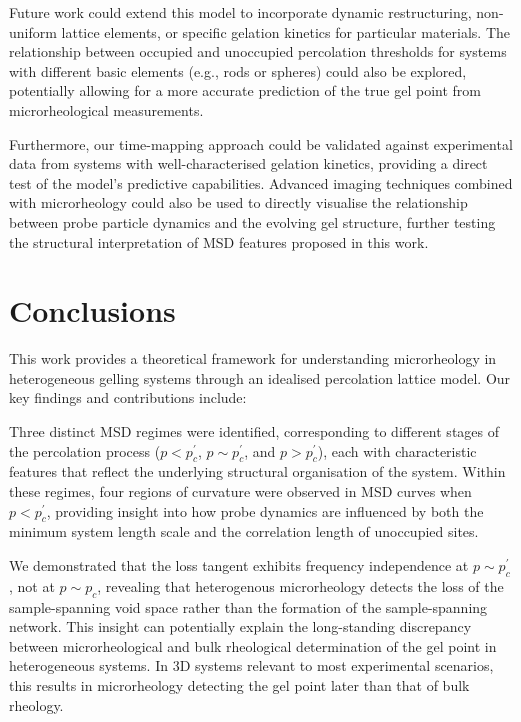 \documentclass[%
 aip,
 amsmath,amssymb,
reprint, onecolumn %
]{revtex4-1}
\begin{document}
Future work could extend this model to incorporate dynamic restructuring, non-uniform lattice elements, or specific gelation kinetics for particular materials. The relationship between occupied and unoccupied percolation thresholds for systems with different basic elements (e.g., rods or spheres) could also be explored, potentially allowing for a more accurate prediction of the true gel point from microrheological measurements.

Furthermore, our time-mapping approach could be validated against  experimental data from systems with well-characterised gelation kinetics, providing a direct test of the model's predictive capabilities. Advanced imaging techniques combined with microrheology could also be used to directly visualise the relationship between probe particle dynamics and the evolving gel structure, further testing the structural interpretation of MSD features proposed in this work.




\section{Conclusions}

This work provides a theoretical framework for understanding microrheology in heterogeneous gelling systems through an idealised percolation lattice model. Our key findings and contributions include:

Three distinct MSD regimes were identified, corresponding to different stages of the percolation process ($p < p_{c}^{'}$, $p \sim p_{c}^{'}$, and $p > p_{c}^{'}$), each with characteristic features that reflect the underlying structural organisation of the system. Within these regimes, four regions of curvature were observed in MSD curves when $p < p_{c}^{'}$, providing insight into how probe dynamics are influenced by both the minimum system length scale and the correlation length of unoccupied sites.

We demonstrated that the loss tangent exhibits frequency independence at $p \sim p_{c}^{'}$, not at $p \sim p_{c}$, revealing that heterogenous microrheology detects the loss of the sample-spanning void space rather than the formation of the sample-spanning network. This insight can potentially explain the long-standing discrepancy between microrheological and bulk rheological determination of the gel point in heterogeneous systems. In 3D systems relevant to most experimental scenarios, this results in microrheology detecting the gel point later than that of bulk rheology.
\end{document}
